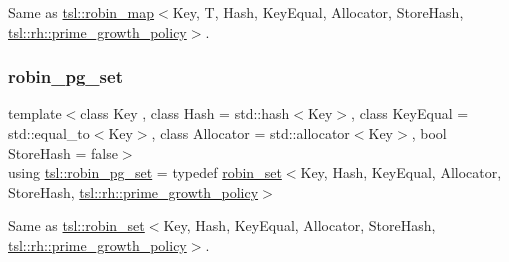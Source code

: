 Same as {\ttfamily \mbox{\hyperlink{classtsl_1_1robin__map}{tsl\+::robin\+\_\+map}}$<$Key, T, Hash, Key\+Equal, Allocator, Store\+Hash, \mbox{\hyperlink{classtsl_1_1rh_1_1prime__growth__policy}{tsl\+::rh\+::prime\+\_\+growth\+\_\+policy}}$>$}. \mbox{\label{namespacetsl_a1759c0a9b912525afb26236b4fb763e8}} 
\subsubsection{\texorpdfstring{robin\_pg\_set}{robin\_pg\_set}}
{\footnotesize\ttfamily template$<$class Key , class Hash  = std\+::hash$<$\+Key$>$, class Key\+Equal  = std\+::equal\+\_\+to$<$\+Key$>$, class Allocator  = std\+::allocator$<$\+Key$>$, bool Store\+Hash = false$>$ \\
using \mbox{\hyperlink{namespacetsl_a1759c0a9b912525afb26236b4fb763e8}{tsl\+::robin\+\_\+pg\+\_\+set}} = typedef \mbox{\hyperlink{classtsl_1_1robin__set}{robin\+\_\+set}}$<$Key, Hash, Key\+Equal, Allocator, Store\+Hash, \mbox{\hyperlink{classtsl_1_1rh_1_1prime__growth__policy}{tsl\+::rh\+::prime\+\_\+growth\+\_\+policy}}$>$}

Same as {\ttfamily \mbox{\hyperlink{classtsl_1_1robin__set}{tsl\+::robin\+\_\+set}}$<$Key, Hash, Key\+Equal, Allocator, Store\+Hash, \mbox{\hyperlink{classtsl_1_1rh_1_1prime__growth__policy}{tsl\+::rh\+::prime\+\_\+growth\+\_\+policy}}$>$}. 